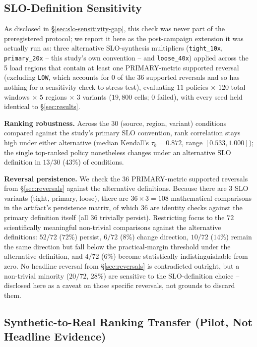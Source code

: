 \subsection{SLO-Definition Sensitivity}
\label{sec:results-slo}

As disclosed in \S\ref{sec:slo-sensitivity-gap}, this check was never part
of the preregistered protocol; we report it here as the post-campaign
extension it was actually run as: three alternative SLO-synthesis
multipliers (\texttt{tight\_10x}, \texttt{primary\_20x} -- this study's own
convention -- and \texttt{loose\_40x}) applied across the 5 load regions
that contain at least one PRIMARY-metric supported reversal (excluding
\texttt{LOW}, which accounts for 0 of the 36 supported reversals and so
has nothing for a sensitivity check to stress-test), evaluating $11$
policies $\times$ $120$ total windows $\times$ $5$ regions $\times$ $3$
variants ($19{,}800$ cells; 0 failed), with every seed held identical to
\S\ref{sec:results}.

\textbf{Ranking robustness.} Across the $30$ (source, region, variant)
conditions compared against the study's primary SLO convention, rank
correlation stays high under either alternative (median Kendall's
$\tau_b = 0.872$, range $[0.533, 1.000]$); the single top-ranked policy
nonetheless changes under an alternative SLO definition in $13/30$ ($43\%$)
of conditions.

\textbf{Reversal persistence.} We check the 36 PRIMARY-metric supported reversals from \S\ref{sec:reversals} against the alternative definitions. Because there are 3 SLO variants (tight, primary, loose), there are $36 \times 3 = 108$ mathematical comparisons in the artifact's persistence matrix, of which $36$ are identity checks against the primary definition itself (all 36 trivially persist). Restricting focus to the $72$ scientifically meaningful non-trivial comparisons against the alternative definitions: $52/72$ ($72\%$) persist, $6/72$ ($8\%$) change direction, $10/72$ ($14\%$) remain the same direction but fall below the practical-margin threshold under the alternative definition, and $4/72$ ($6\%$) become statistically indistinguishable from zero. No headline reversal from \S\ref{sec:reversals} is contradicted outright, but a non-trivial minority ($20/72$, $28\%$) are sensitive to the SLO-definition
choice -- disclosed here as a caveat on those specific reversals, not
grounds to discard them.

\subsection{Synthetic-to-Real Ranking Transfer (Pilot, Not Headline Evidence)}
\label{sec:results-rq3-pilot}

